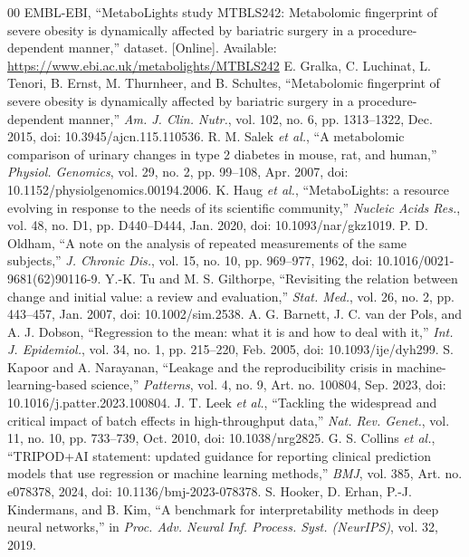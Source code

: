 \documentclass[conference]{IEEEtran}
\begin{document}
\begin{thebibliography}{00}
 EMBL-EBI, ``MetaboLights study MTBLS242: Metabolomic fingerprint of severe obesity is dynamically affected by bariatric surgery in a procedure-dependent manner,'' dataset. [Online]. Available: \url{https://www.ebi.ac.uk/metabolights/MTBLS242}
 E. Gralka, C. Luchinat, L. Tenori, B. Ernst, M. Thurnheer, and B. Schultes, ``Metabolomic fingerprint of severe obesity is dynamically affected by bariatric surgery in a procedure-dependent manner,'' \textit{Am. J. Clin. Nutr.}, vol. 102, no. 6, pp. 1313--1322, Dec. 2015, doi: 10.3945/ajcn.115.110536.
 R. M. Salek \textit{et al.}, ``A metabolomic comparison of urinary changes in type 2 diabetes in mouse, rat, and human,'' \textit{Physiol. Genomics}, vol. 29, no. 2, pp. 99--108, Apr. 2007, doi: 10.1152/physiolgenomics.00194.2006.
 K. Haug \textit{et al.}, ``MetaboLights: a resource evolving in response to the needs of its scientific community,'' \textit{Nucleic Acids Res.}, vol. 48, no. D1, pp. D440--D444, Jan. 2020, doi: 10.1093/nar/gkz1019.
 P. D. Oldham, ``A note on the analysis of repeated measurements of the same subjects,'' \textit{J. Chronic Dis.}, vol. 15, no. 10, pp. 969--977, 1962, doi: 10.1016/0021-9681(62)90116-9.
 Y.-K. Tu and M. S. Gilthorpe, ``Revisiting the relation between change and initial value: a review and evaluation,'' \textit{Stat. Med.}, vol. 26, no. 2, pp. 443--457, Jan. 2007, doi: 10.1002/sim.2538.
 A. G. Barnett, J. C. van der Pols, and A. J. Dobson, ``Regression to the mean: what it is and how to deal with it,'' \textit{Int. J. Epidemiol.}, vol. 34, no. 1, pp. 215--220, Feb. 2005, doi: 10.1093/ije/dyh299.
 S. Kapoor and A. Narayanan, ``Leakage and the reproducibility crisis in machine-learning-based science,'' \textit{Patterns}, vol. 4, no. 9, Art. no. 100804, Sep. 2023, doi: 10.1016/j.patter.2023.100804.
 J. T. Leek \textit{et al.}, ``Tackling the widespread and critical impact of batch effects in high-throughput data,'' \textit{Nat. Rev. Genet.}, vol. 11, no. 10, pp. 733--739, Oct. 2010, doi: 10.1038/nrg2825.
 G. S. Collins \textit{et al.}, ``TRIPOD+AI statement: updated guidance for reporting clinical prediction models that use regression or machine learning methods,'' \textit{BMJ}, vol. 385, Art. no. e078378, 2024, doi: 10.1136/bmj-2023-078378.
 S. Hooker, D. Erhan, P.-J. Kindermans, and B. Kim, ``A benchmark for interpretability methods in deep neural networks,'' in \textit{Proc. Adv. Neural Inf. Process. Syst. (NeurIPS)}, vol. 32, 2019.

\end{thebibliography}
\end{document}
